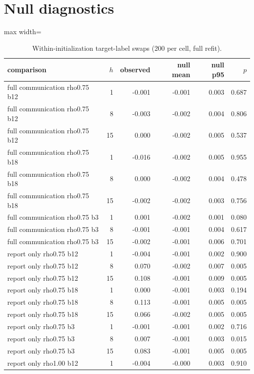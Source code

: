 \documentclass[11pt]{article}
\begin{document}
\section{Null diagnostics}
\begin{table}[htbp]\centering\small
\caption{Within-initialization target-label swaps (200 per cell, full refit).}\label{tab:swaps}
\begin{adjustbox}{max width=\textwidth}
\begin{tabular}{lrrrrr}
\toprule
comparison & $h$ & observed & null mean & null p95 & $p$ \\
\midrule
full communication rho0.75 b12 & 1 & -0.001 & -0.001 & 0.003 & 0.687 \\
full communication rho0.75 b12 & 8 & -0.003 & -0.002 & 0.004 & 0.806 \\
full communication rho0.75 b12 & 15 & 0.000 & -0.002 & 0.005 & 0.537 \\
full communication rho0.75 b18 & 1 & -0.016 & -0.002 & 0.005 & 0.955 \\
full communication rho0.75 b18 & 8 & 0.000 & -0.002 & 0.004 & 0.478 \\
full communication rho0.75 b18 & 15 & -0.002 & -0.002 & 0.003 & 0.756 \\
full communication rho0.75 b3 & 1 & 0.001 & -0.002 & 0.001 & 0.080 \\
full communication rho0.75 b3 & 8 & -0.001 & -0.001 & 0.004 & 0.617 \\
full communication rho0.75 b3 & 15 & -0.002 & -0.001 & 0.006 & 0.701 \\
report only rho0.75 b12 & 1 & -0.004 & -0.001 & 0.002 & 0.900 \\
report only rho0.75 b12 & 8 & 0.070 & -0.002 & 0.007 & 0.005 \\
report only rho0.75 b12 & 15 & 0.108 & -0.001 & 0.009 & 0.005 \\
report only rho0.75 b18 & 1 & 0.000 & -0.001 & 0.003 & 0.194 \\
report only rho0.75 b18 & 8 & 0.113 & -0.001 & 0.005 & 0.005 \\
report only rho0.75 b18 & 15 & 0.066 & -0.002 & 0.005 & 0.005 \\
report only rho0.75 b3 & 1 & -0.001 & -0.001 & 0.002 & 0.716 \\
report only rho0.75 b3 & 8 & 0.007 & -0.001 & 0.003 & 0.015 \\
report only rho0.75 b3 & 15 & 0.083 & -0.001 & 0.005 & 0.005 \\
report only rho1.00 b12 & 1 & -0.004 & -0.000 & 0.003 & 0.910 \\

\end{tabular}
\end{adjustbox}
\end{table}
\end{document}

